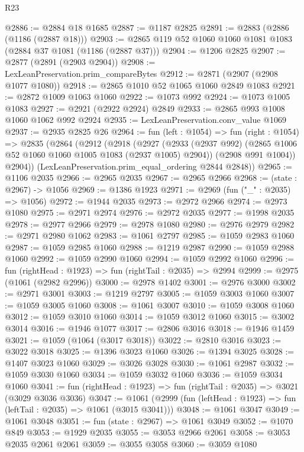 \begin{lexlean}{R23}
\begin{coremodule}
@2886 := @2884 @18 @1685
@2887 := @1187 @2825
@2891 := @2883 (@2886 (@1186 (@2887 @18)))
@2903 := @2865 @119 @52 @1060 @1060 @1081 @1083 (@2884 @37 @1081 (@1186 (@2887 @37)))
@2904 := @1206 @2825
@2907 := @2877 (@2891 (@2903 @2904))
@2908 := LexLeanPreservation.prim_compareBytes
@2912 := @2871 (@2907 (@2908 @1077 @1080))
@2918 := @2865 @1010 @52 @1065 @1060 @2849 @1083
@2921 := @2872 @1009 @1063 @1060
@2922 := @1073 @992
@2924 := @1073 @1005 @1083
@2927 := @2921 (@2922 @2924) @2849
@2933 := @2865 @993 @1008 @1060 @1062 @992 @2924
@2935 := LexLeanPreservation.conv_value @1069
@2937 := @2935 @2825 @26
@2964 := fun (left : @1054) =>
  fun (right : @1054) =>
  @2835
    (@2864
      (@2912
        (@2918
          (@2927
            (@2933 (@2937 @992) (@2865 @1006 @52 @1060 @1060 @1005 @1083 (@2937 @1005) @2904))
            (@2908 @991 @1004))
          @2904))
      (LexLeanPreservation.prim_equal_ordering @2844 @2848))
@2965 := @1106 @2035
@2966 := @2965 @2035
@2967 := @2965 @2966
@2968 := (state : @2967) -> @1056
@2969 := @1386 @1923
@2971 := @2969 (fun ("_" : @2035) => @1056)
@2972 := @1944 @2035
@2973 := @2972 @2966
@2974 := @2973 @1080
@2975 := @2971 @2974
@2976 := @2972 @2035
@2977 := @1998 @2035
@2978 := @2977 @2966
@2979 := @2978 @1080
@2980 := @2976 @2979
@2982 := @2971 @2980 @1062
@2983 := @1061 @2797
@2985 := @1059 @2983 @1060
@2987 := @1059 @2985 @1060
@2988 := @1219 @2987
@2990 := @1059 @2988 @1060
@2992 := @1059 @2990 @1060
@2994 := @1059 @2992 @1060
@2996 := fun (rightHead : @1923) => fun (rightTail : @2035) => @2994
@2999 := @2975 (@1061 (@2982 @2996))
@3000 := @2978 @1402
@3001 := @2976 @3000
@3002 := @2971 @3001
@3003 := @1219 @2797
@3005 := @1059 @3003 @1060
@3007 := @1059 @3005 @1060
@3008 := @1061 @3007
@3010 := @1059 @3008 @1060
@3012 := @1059 @3010 @1060
@3014 := @1059 @3012 @1060
@3015 := @3002 @3014
@3016 := @1946 @1077
@3017 := @2806 @3016
@3018 := @1946 @1459
@3021 := @1059 (@1064 (@3017 @3018))
@3022 := @2810 @3016
@3023 := @3022 @3018
@3025 := @1396 @3023 @1060
@3026 := @1394 @3025
@3028 := @1407 @3023 @1060
@3029 := @3026 @3028
@3030 := @1061 @2987
@3032 := @1059 @3030 @1060
@3034 := @1059 @3032 @1060
@3036 := @1059 @3034 @1060
@3041 := fun (rightHead : @1923) => fun (rightTail : @2035) => @3021 (@3029 @3036 @3036)
@3047 := @1061 (@2999 (fun (leftHead : @1923) => fun (leftTail : @2035) => @1061 (@3015 @3041)))
@3048 := @1061 @3047
@3049 := @1061 @3048
@3051 := fun (state : @2967) => @1061 @3049
@3052 := @1070 @849
@3053 := @1929 @2035
@3055 := @3053 @2966 @2061
@3058 := @3053 @2035 @2061 @2061
@3059 := @3055 @3058
@3060 := @3059 @1080

\end{coremodule}
\end{lexlean}
